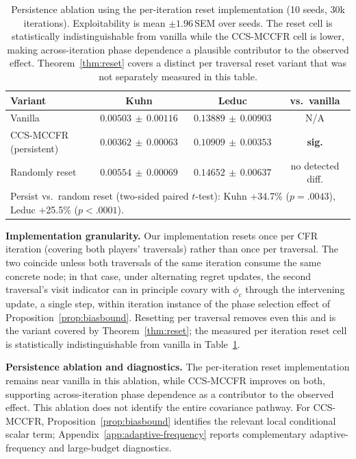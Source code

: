 \documentclass[11pt]{article}
\begin{document}
\begin{table}[h]
\centering
\small
\caption{Persistence ablation using the per-iteration reset implementation (10 seeds, 30k iterations). Exploitability is mean $\pm 1.96$\,SEM over seeds. The reset cell is statistically indistinguishable from vanilla while the CCS-MCCFR cell is lower, making across-iteration phase dependence a plausible contributor to the observed effect. Theorem~\ref{thm:reset} covers a distinct per traversal reset variant that was not separately measured in this table.}
\label{tab:persistence}
\begin{tabular}{lccc}
\toprule
Variant & Kuhn & Leduc & vs.\ vanilla \\
\midrule
Vanilla              & $0.00503\,{\pm}\,0.00116$ & $0.13889\,{\pm}\,0.00903$ & N/A \\
CCS-MCCFR (persistent) & $0.00362\,{\pm}\,0.00063$ & $0.10909\,{\pm}\,0.00353$ & \textbf{sig.} \\
Randomly reset        & $0.00554\,{\pm}\,0.00069$ & $0.14652\,{\pm}\,0.00637$ & no detected diff. \\
\bottomrule
\multicolumn{4}{l}{\footnotesize Persist vs.\ random reset (two-sided paired $t$-test): Kuhn +34.7\% ($p{=}.0043$), Leduc +25.5\% ($p{<}.0001$).}
\end{tabular}
\end{table}

\textbf{Implementation granularity.} Our implementation resets once per CFR iteration (covering both players' traversals) rather than once per traversal. The two coincide unless both traversals of the same iteration consume the same concrete node; in that case, under alternating regret updates, the second traversal's visit indicator can in principle covary with $\phi_c$ through the intervening update, a single step, within iteration instance of the phase selection effect of Proposition~\ref{prop:biasbound}. Resetting per traversal removes even this and is the variant covered by Theorem~\ref{thm:reset}; the measured per iteration reset cell is statistically indistinguishable from vanilla in Table~\ref{tab:persistence}.

\textbf{Persistence ablation and diagnostics.} The per-iteration reset implementation remains near vanilla in this ablation, while CCS-MCCFR improves on both, supporting across-iteration phase dependence as a contributor to the observed effect. This ablation does not identify the entire covariance pathway. For CCS-MCCFR, Proposition~\ref{prop:biasbound} identifies the relevant local conditional scalar term; Appendix~\ref{app:adaptive-frequency} reports complementary adaptive-frequency and large-budget diagnostics.
\end{document}
